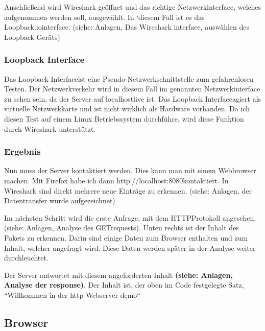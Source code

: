 \documentclass[12pt]{article}
\begin{document}
Anschließend wird Wireshark geöffnet und das richtige Netzwerkinterface, welches aufgenommen werden soll, ausgewählt. In `diesem Fall ist es das \glq Loopback:io\grq interface. (siehe: Anlagen, Das Wireshark interface, auswählen des Loopback Geräts)
\subsubsection{Loopback Interface}

Das \glq Loopback Interface\grq ist eine \glqq Pseudo-Netzwerkschnittstelle zum gefahrenlosen Testen\grqq\cite{loopback-munich}. Der Netzwerkverkehr wird in diesem Fall im genannten Netzwerkinterface zu sehen sein, da der Server auf \glq localhost\grq live ist. Das \glq Loopback Interface\grq agiert als virtuelle Netzwerkkarte und ist nicht wirklich als Hardware vorhanden. Da ich diesen Test auf einem Linux Betriebssystem durchführe, wird diese Funktion durch Wireshark unterstützt.\cite{loopback-wireshark}

\subsubsection{Ergebnis}

Nun muss der Server kontaktiert werden. Dies kann man mit einem Webbrowser machen. Mit Firefox habe ich dann \glq http://localhost:8080\grq kontaktiert. In Wireshark sind direkt mehrere neue Einträge zu erkennen. (siehe: Anlagen, der Datentransfer wurde aufgezeichnet)

Im nächsten Schritt wird die erste Anfrage, mit dem \glq HTTP\grq Protokoll angesehen. (siehe: Anlagen, Analyse des \glq GET\grq requests). Unten rechts ist der Inhalt des Pakets zu erkennen. Darin sind einige Daten zum Browser enthalten und zum Inhalt, welcher angefragt wird. Diese Daten werden später in der Analyse weiter durchleuchtet.

Der Server antwortet mit diesem angeforderten Inhalt \textbf{(siehe: Anlagen, Analyse der response)}. Der Inhalt ist, der oben im Code festgelegte Satz, ``Willkommen in der http Webserver demo``

\subsection{Browser}
\end{document}
